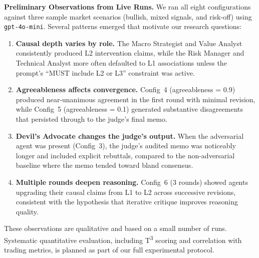 \textbf{Preliminary Observations from Live Runs.}
We ran all eight configurations against three sample market scenarios (bullish, mixed signals, and risk-off) using \texttt{gpt-4o-mini}. Several patterns emerged that motivate our research questions:

\begin{enumerate}
\setlength\itemsep{2pt}
  \item \textbf{Causal depth varies by role.} The Macro Strategist and Value Analyst consistently produced L2 intervention claims, while the Risk Manager and Technical Analyst more often defaulted to L1 associations unless the prompt's ``MUST include L2 or L3'' constraint was active.
  \item \textbf{Agreeableness affects convergence.} Config~4 (agreeableness = 0.9) produced near-unanimous agreement in the first round with minimal revision, while Config~5 (agreeableness = 0.1) generated substantive disagreements that persisted through to the judge's final memo.
  \item \textbf{Devil's Advocate changes the judge's output.} When the adversarial agent was present (Config~3), the judge's audited memo was noticeably longer and included explicit rebuttals, compared to the non-adversarial baseline where the memo tended toward bland consensus.
  \item \textbf{Multiple rounds deepen reasoning.} Config~6 (3 rounds) showed agents upgrading their causal claims from L1 to L2 across successive revisions, consistent with the hypothesis that iterative critique improves reasoning quality.
\end{enumerate}

These observations are qualitative and based on a small number of runs. Systematic quantitative evaluation, including T\textsuperscript{3} scoring and correlation with trading metrics, is planned as part of our full experimental protocol.
